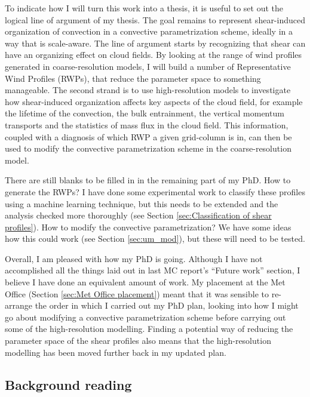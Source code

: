 \documentclass[11pt,a4paper]{article}
\begin{document}
To indicate how I will turn this work into a thesis, it is useful to set out the logical line of argument of my thesis. The goal remains to represent shear-induced organization of convection in a convective parametrization scheme, ideally in a way that is scale-aware. The line of argument starts by recognizing that shear can have an organizing effect on cloud fields. By looking at the range of wind profiles generated in coarse-resolution models, I will build a number of Representative Wind Profiles (RWPs), that reduce the parameter space to something manageable. The second strand is to use high-resolution models to investigate how shear-induced organization affects key aspects of the cloud field, for example the lifetime of the convection, the bulk entrainment, the vertical momentum transports and the statistics of mass flux in the cloud field. This information, coupled with a diagnosis of which RWP a given grid-column is in, can then be used to modify the convective parametrization scheme in the coarse-resolution model.

There are still blanks to be filled in in the remaining part of my PhD. How to generate the RWPs? I have done some experimental work to classify these profiles using a machine learning technique, but this needs to be extended and the analysis checked more thoroughly (see Section \ref{sec:Classification of shear profiles}). How to modify the convective parametrization? We have some ideas how this could work (see Section \ref{sec:um_mod}), but these will need to be tested. 

Overall, I am pleased with how my PhD is going. Although I have not accomplished all the things laid out in last MC report's ``Future work'' section, I believe I have done an equivalent amount of work. My placement at the Met Office (Section \ref{sec:Met Office placement}) meant that it was sensible to re-arrange the order in which I carried out my PhD plan, looking into how I might go about modifying a convective parametrization scheme before carrying out some of the high-resolution modelling. Finding a potential way of reducing the parameter space of the shear profiles also means that the high-resolution modelling has been moved further back in my updated plan. 

\subsection{Background reading}
\label{sec:Background reading}

\end{document}
